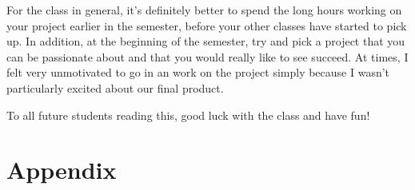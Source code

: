 \documentclass[12pt]{report}
\begin{document}
For the class in general, it's definitely better to spend the long hours working on your project earlier in the semester, before your other classes have started to pick up. In addition, at the beginning of the semester, try and pick a project that you can be passionate about and that you would really like to see succeed. At times, I felt very unmotivated to go in an work on the project simply because I wasn't particularly excited about our final product.

To all future students reading this, good luck with the class and have fun!

\printbibliography
\appendix
\chapter{Appendix}
\end{document}
